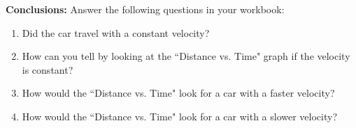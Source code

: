    \par
  \par 
        \label{m38795*id71722}\noindent{}\textbf{Conclusions:}
Answer the following questions in your workbook:
        \label{m38795*id71746}\begin{enumerate}[noitemsep, label=\textbf{\arabic*}. ] 
            \label{m38795*uid108}\item Did the car travel with a constant velocity?
\label{m38795*uid109}\item How can you tell by looking at the ``Distance vs. Time" graph if the velocity is constant?
\label{m38795*uid110}\item How would the ``Distance vs. Time" look for a car with a faster velocity?
\label{m38795*uid111}\item How would the ``Distance vs. Time" look for a car with a slower velocity?
\end{enumerate}
        \par 
      \label{m38795*uid112}
